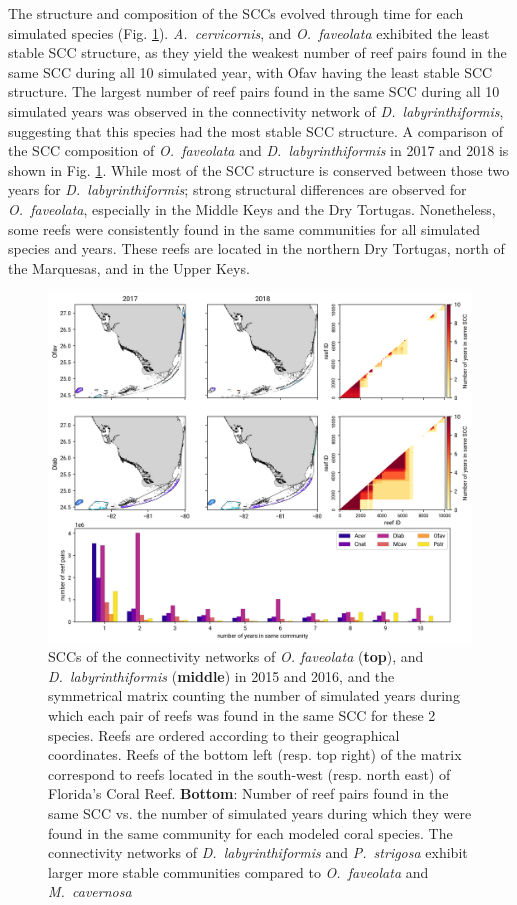 \documentclass[preprint,12pt,authoryear]{elsarticle}
\begin{document}
The structure and composition of the SCCs evolved through time for each simulated species (Fig. \ref{fig:scc}). \textit{A.~cervicornis},  and \textit{O.~faveolata} exhibited the least stable SCC structure, as they yield the weakest number of reef pairs found in the same SCC during all 10 simulated year, with Ofav having the least stable SCC structure. The largest number of reef pairs found in the same SCC during all 10 simulated years was observed in the connectivity network of \textit{D.~labyrinthiformis}, suggesting that this species had the most stable SCC structure. A comparison of the SCC composition of \textit{O.~faveolata} and \textit{D.~labyrinthiformis} in 2017 and 2018 is shown in Fig. \ref{fig:scc}. While most of the SCC structure is conserved between those two years for \textit{D.~labyrinthiformis}; strong structural differences are observed for \textit{O.~faveolata}, especially in the Middle Keys and the Dry Tortugas. Nonetheless, some reefs were consistently found in the same communities for all simulated species and years. These reefs are located in the northern Dry Tortugas, north of the Marquesas, and in the Upper Keys.

\begin{figure}
    \centering
    \includegraphics[width=\textwidth]{figures/comparison_sccs.png}
    \caption{SCCs of the connectivity networks of \textit{O. faveolata} (\textbf{top}), and \textit{D.~labyrinthiformis} (\textbf{middle}) in 2015 and 2016, and the symmetrical matrix counting the number of simulated years during which each pair of reefs was found in the same SCC for these 2 species. Reefs are ordered according to their geographical coordinates. Reefs of the bottom left (resp. top right) of the matrix correspond to reefs located in the south-west (resp. north east) of Florida's Coral Reef. \textbf{Bottom}: Number of reef pairs found in the same SCC vs. the number of simulated years during which they were found in the same community for each modeled coral species. The connectivity networks of \textit{D.~labyrinthiformis} and \textit{P.~strigosa} exhibit larger more stable communities compared to \textit{O.~faveolata} and \textit{M.~cavernosa}}\label{fig:scc}
\end{figure}
\end{document}
